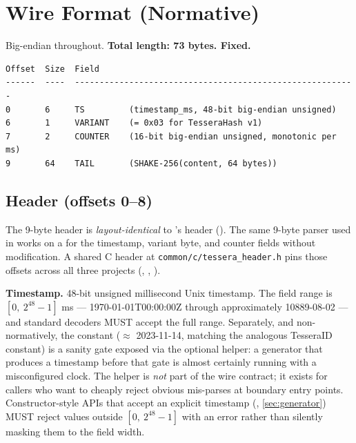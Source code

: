 \section{Wire Format (Normative)}
\label{sec:wire-format}

Big-endian throughout. \textbf{Total length: 73 bytes. Fixed.}

\begin{lstlisting}[language=Pseudocode]
Offset  Size  Field
------  ----  ---------------------------------------------------------
0       6     TS         (timestamp_ms, 48-bit big-endian unsigned)
6       1     VARIANT    (= 0x03 for TesseraHash v1)
7       2     COUNTER    (16-bit big-endian unsigned, monotonic per ms)
9       64    TAIL       (SHAKE-256(content, 64 bytes))
\end{lstlisting}

\subsection{Header (offsets 0--8)}

The 9-byte header is \emph{layout-identical} to \tesseraid{}'s header (). The same 9-byte parser used in \tesseraid{} works on a \tesserahash{} for the timestamp, variant byte, and counter fields without modification. A shared C header at \texttt{common/c/tessera\_header.h} pins those offsets across all three \tessera{} projects (\tesseraid{}, \tesserahash{}, \tesseraseal{}).

\textbf{Timestamp.} 48-bit unsigned millisecond Unix timestamp. The field range is $[0,\ 2^{48}-1]$ ms --- 1970-01-01T00:00:00Z through approximately 10889-08-02 --- and standard decoders MUST accept the full range. Separately, and non-normatively, the constant  ($\approx$ 2023-11-14, matching the analogous TesseraID constant) is a sanity gate exposed via the optional  helper: a generator that produces a timestamp before that gate is almost certainly running with a misconfigured clock. The helper is \emph{not} part of the wire contract; it exists for callers who want to cheaply reject obvious mis-parses at boundary entry points. Constructor-style APIs that accept an explicit timestamp (, \cref{sec:generator}) MUST reject values outside $[0,\ 2^{48}-1]$ with an error rather than silently masking them to the field width.

